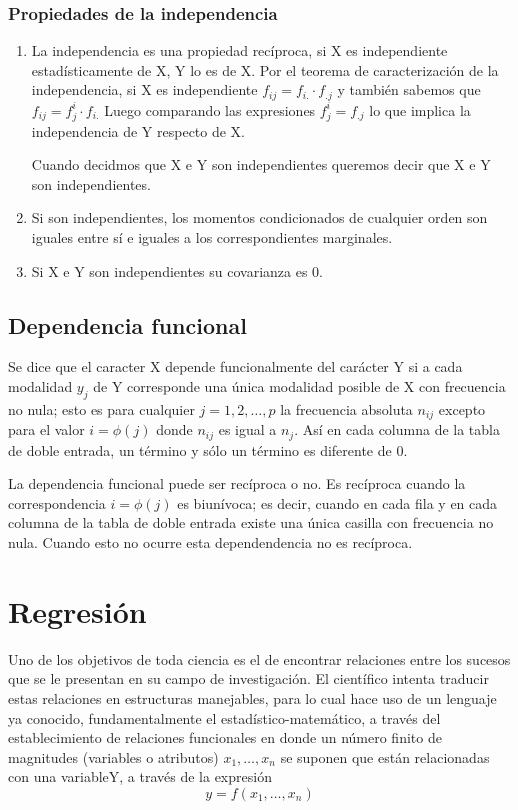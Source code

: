 \documentclass{article}
\theoremstyle{definition}
\begin{document}
 \subsubsection{Propiedades de la independencia}

 \begin{enumerate} \item La independencia es una propiedad recíproca, si X es
 independiente estadísticamente de X, Y lo es de X. Por el teorema de
 caracterización de la independencia, si X es independiente $ f_{ij} = f_{i.}
 \cdot f_{.j} $ y también sabemos que $f_{ij} = f_j^i \cdot f_{i.}$ Luego
 comparando las expresiones  $f_j^i = f_{.j} $ lo que implica la independencia
 de Y respecto de X.

 Cuando decidmos que X e Y son independientes queremos decir que X e Y son
 independientes.

 \item Si son independientes, los momentos condicionados de cualquier orden son
 iguales entre sí e iguales a los correspondientes marginales. \item Si X e Y
 son independientes su covarianza es 0.

 \end{enumerate}

\subsection{Dependencia funcional}

Se dice que el caracter X depende funcionalmente del carácter Y si a cada
modalidad $y_j$ de Y corresponde una única modalidad posible de X con frecuencia
no nula; esto es para cualquier $j=1,2,\dots,p$ la frecuencia absoluta $n_{ij}$
excepto para el valor $i = \phi (j)$ donde $n_{ij} $ es igual a $n_j$. Así en
cada columna de la tabla de doble entrada, un término y sólo un término es
diferente de 0.

	La dependencia funcional puede ser recíproca o no. Es recíproca cuando la
	correspondencia $i = \phi (j)$ es biunívoca; es decir, cuando en cada fila y
	en cada columna de la tabla de doble entrada existe una única casilla con
	frecuencia no nula. Cuando esto no ocurre esta dependendencia no es recíproca.

\section{Regresión}

Uno de los objetivos de toda ciencia es el de encontrar relaciones entre los
sucesos que se le presentan en su campo de investigación.
El científico intenta traducir estas relaciones en estructuras manejables, para
lo cual hace uso de un lenguaje ya conocido, fundamentalmente el
estadístico-matemático, a través del establecimiento de relaciones funcionales
en donde un número finito de magnitudes (variables o atributos) $x_1, \ldots,
x_n$ se suponen que están relacionadas con una variableY, a través de la
expresión $$y = f(x_1, \ldots, x_n)$$
\end{document}
